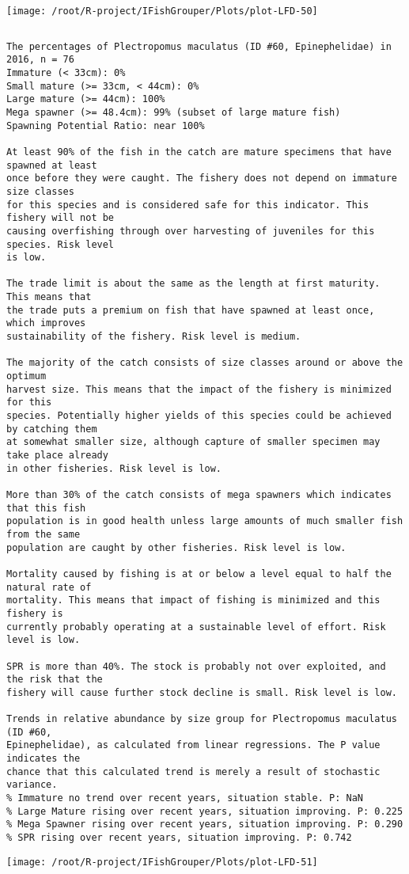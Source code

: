 \documentclass{report}\usepackage[]{graphicx}\usepackage[]{color}
\makeatletter
\def\maxwidth{ %
  \ifdim\Gin@nat@width>\linewidth
    \linewidth
  \else
    \Gin@nat@width
  \fi
}
\newenvironment{kframe}{%
 \def\at@end@of@kframe{}%
 \ifinner\ifhmode%
  \def\at@end@of@kframe{\end{minipage}}%
  \begin{minipage}{\columnwidth}%
 \fi\fi%
 \def\FrameCommand##1{\hskip\@totalleftmargin \hskip-\fboxsep
 \colorbox{shadecolor}{##1}\hskip-\fboxsep
     \hskip-\linewidth \hskip-\@totalleftmargin \hskip\columnwidth}%
 \MakeFramed {\advance\hsize-\width
   \@totalleftmargin\z@ \linewidth\hsize
   \@setminipage}}%
 {\par\unskip\endMakeFramed%
 \at@end@of@kframe}
\newenvironment{knitrout}{}{} %
\makeatother
\begin{document}
\begin{knitrout}
\texttt{[image: /root/R-project/IFishGrouper/Plots/plot-LFD-50]} 
\begin{kframe}\begin{verbatim}
\end{verbatim}
\end{kframe}
\clearpage
\newpage
\begin{kframe}\begin{verbatim}The percentages of Plectropomus maculatus (ID #60, Epinephelidae) in 2016, n = 76
Immature (< 33cm): 0%
Small mature (>= 33cm, < 44cm): 0%
Large mature (>= 44cm): 100%
Mega spawner (>= 48.4cm): 99% (subset of large mature fish)
Spawning Potential Ratio: near 100%
 
At least 90% of the fish in the catch are mature specimens that have spawned at least
once before they were caught. The fishery does not depend on immature size classes
for this species and is considered safe for this indicator. This fishery will not be
causing overfishing through over harvesting of juveniles for this species. Risk level
is low.

The trade limit is about the same as the length at first maturity.  This means that
the trade puts a premium on fish that have spawned at least once, which improves
sustainability of the fishery. Risk level is medium.

The majority of the catch consists of size classes around or above the optimum
harvest size. This means that the impact of the fishery is minimized for this
species. Potentially higher yields of this species could be achieved by catching them
at somewhat smaller size, although capture of smaller specimen may take place already
in other fisheries. Risk level is low.

More than 30% of the catch consists of mega spawners which indicates that this fish
population is in good health unless large amounts of much smaller fish from the same
population are caught by other fisheries. Risk level is low.
 
Mortality caused by fishing is at or below a level equal to half the natural rate of
mortality. This means that impact of fishing is minimized and this fishery is
currently probably operating at a sustainable level of effort. Risk level is low.
 
SPR is more than 40%. The stock is probably not over exploited, and the risk that the
fishery will cause further stock decline is small. Risk level is low.
 
Trends in relative abundance by size group for Plectropomus maculatus (ID #60,
Epinephelidae), as calculated from linear regressions. The P value indicates the
chance that this calculated trend is merely a result of stochastic variance.
% Immature no trend over recent years, situation stable. P: NaN
% Large Mature rising over recent years, situation improving. P: 0.225
% Mega Spawner rising over recent years, situation improving. P: 0.290
% SPR rising over recent years, situation improving. P: 0.742
\end{verbatim}
\end{kframe}
\texttt{[image: /root/R-project/IFishGrouper/Plots/plot-LFD-51]} 


\end{knitrout}
\end{document}
